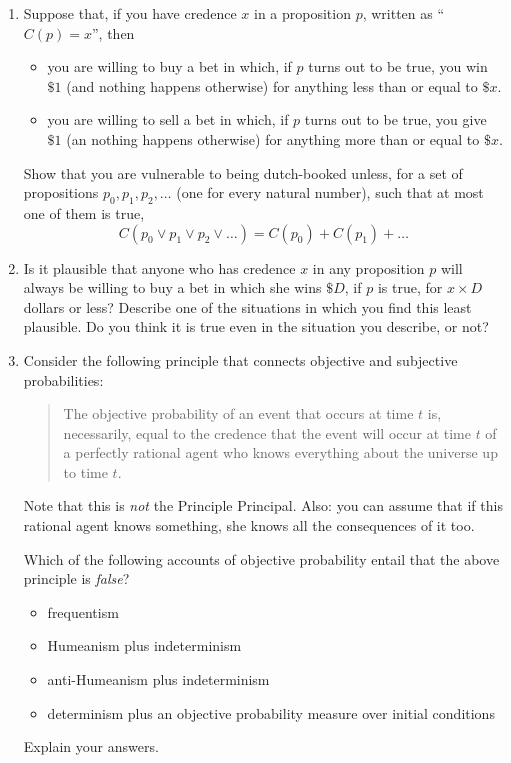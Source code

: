 \documentclass[12pt,a4paper]{article}
\begin{document}
\begin{enumerate}

\item Suppose that, if you have credence $x$ in a proposition $p$, written as ``$C(p)=x$'', then 
\begin{itemize}
\item you are willing to buy a bet in which, if $p$ turns out to be true, you win $\$1$ (and nothing happens otherwise) for anything less than or equal to $\$x$.
\item you are willing to sell a bet in which, if $p$ turns out to be true, you give $\$1$ (an nothing happens otherwise) for anything more than or equal to $\$x$.
\end{itemize}
Show that you are vulnerable to being dutch-booked unless, for a set of propositions $p_0, p_1, p_2,\ldots$ (one for every natural number), such that at most one of them is true, $$C(p_0 \vee p_1 \vee p_2 \vee \ldots)= C(p_0) + C(p_1) + \ldots$$

\item Is it plausible that anyone who has credence $x$ in any proposition $p$ will always be willing to buy a bet in which she wins $\$D$, if $p$ is true, for $x\times D$ dollars or less? Describe one of the situations in which you find this least plausible. Do you think it is true even in the situation you describe, or not?

\item Consider the following principle that connects objective and subjective probabilities:
\begin{quote}
The objective probability of an event that occurs at time $t$ is, necessarily, equal to the credence that the event will occur at time $t$ of a perfectly rational agent who knows everything about the universe up to time $t$.
\end{quote}
Note that this is \emph{not} the Principle Principal. Also: you can assume that if this rational agent knows something, she knows all the consequences of it too.

Which of the following accounts of objective probability entail that the above principle is \emph{false}?
	\begin{itemize} 
	\item frequentism
	\item Humeanism plus indeterminism
	\item anti-Humeanism plus indeterminism
	\item determinism plus an objective probability measure over initial conditions
	\end{itemize}
Explain your answers.


\end{enumerate}
\end{document}

